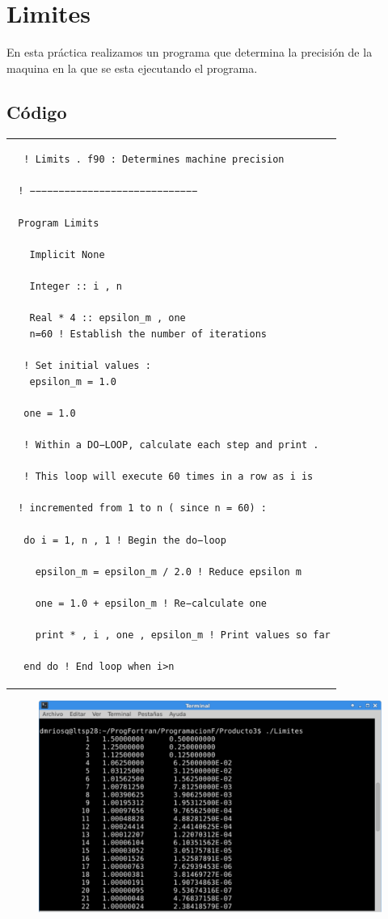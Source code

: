 \documentclass[10pt]{article}
\begin{document}
\section{Limites}
En esta práctica realizamos un programa que determina la precisión de la maquina en la que se esta ejecutando el programa.

\subsection{Código}
\begin{tabular}{l}
\begin{verbatim}  
  ! Limits . f90 : Determines machine precision

 ! −−−−−−−−−−−−−−−−−−−−−−−−−−−−−

 Program Limits

   Implicit None

   Integer :: i , n

   Real * 4 :: epsilon_m , one
   n=60 ! Establish the number of iterations

  ! Set initial values :
   epsilon_m = 1.0

  one = 1.0

  ! Within a DO−LOOP, calculate each step and print .

  ! This loop will execute 60 times in a row as i is

 ! incremented from 1 to n ( since n = 60) :

  do i = 1, n , 1 ! Begin the do−loop

    epsilon_m = epsilon_m / 2.0 ! Reduce epsilon m

    one = 1.0 + epsilon_m ! Re−calculate one

    print * , i , one , epsilon_m ! Print values so far

  end do ! End loop when i>n
\end{verbatim}
\end{tabular}


\begin{figure}
  \centering
    \includegraphics[scale=0.4]{L}
\end{figure}
\end{document}
